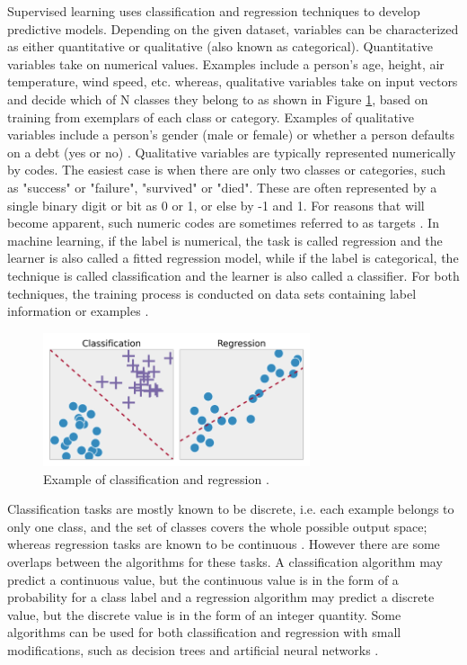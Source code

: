 Supervised learning uses classification and regression techniques
to develop predictive models. Depending on the given dataset, variables can be characterized as either quantitative or qualitative (also known as categorical). Quantitative variables take on numerical values. Examples include a person's age, height, air temperature, wind speed, etc. whereas, qualitative variables take on input vectors and decide which of N classes
they belong to as shown in Figure \ref{RC}, based on training from exemplars of each class or category. Examples of qualitative variables include a person’s gender (male or female) or whether a person defaults on a debt (yes or no) \citep{aitkin2009statistical}. Qualitative variables are typically represented numerically by codes. The easiest case is when there are only two classes or categories, such as "success"
or "failure", "survived" or "died". These are often represented by a single binary digit or bit as 0 or 1, or else by -1 and 1. For reasons that will become apparent, such numeric codes are sometimes referred to as targets \citep{friedman2001elements}. In machine learning, if the label is numerical, the task is called regression and the learner is also called a fitted regression model, while if the label is categorical, the technique is called classification and the learner is also called a classifier. For both techniques, the training process is conducted on data sets containing label information or examples \citep{zhou2012ensemble}.

\begin{figure}[H]
  \centering
    \includegraphics[width=0.7\textwidth]{images/RC.png}
    \caption{Example of classification and regression \citep{rossant2018ipython}.}
  \label{RC}
  
\end{figure}
Classification tasks are mostly known to be discrete, i.e. each example belongs to only one class, and the set of classes covers the whole possible output space; whereas regression tasks are known to be continuous \citep{stephen2009machine}. However there are some overlaps between the algorithms for these tasks. A classification algorithm may predict a continuous value, but the continuous value is in the form of a probability for a class label and a regression algorithm may predict a discrete value, but the discrete value is in the form of an integer quantity. Some algorithms can be used for both classification and regression with small modifications, such as decision trees and artificial neural networks \citep{brownlee2013prepare}.  

